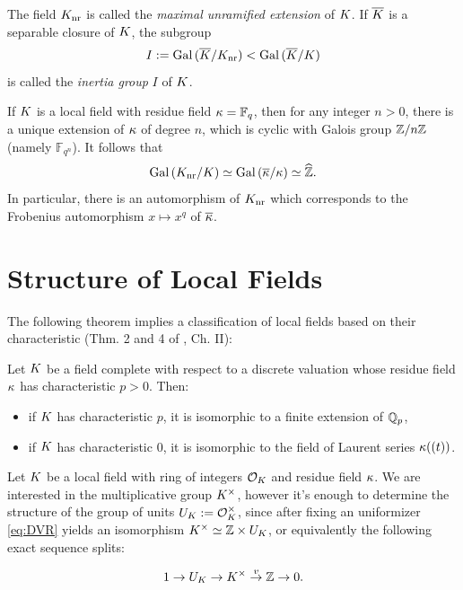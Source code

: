 \documentclass[a4paper, oneside]{memoir}
\begin{document}
The field $K_{\text{nr}}$ is called the \textit{maximal unramified extension} of $K$. If $\overline{K}$ is a separable closure of $K$, the subgroup
\[
	I:=\operatorname{Gal}{(\overline{K}/K_{\text{nr}})} < \operatorname{Gal}{(\overline{K}/K)}
\]
is called the \textit{inertia group} $I$ of $K$.

\begin{example}\label{ex:FinFields}
	If $K$ is a local field with residue field $\kappa=\mathbb{F}_q$, then for any integer $n>0$, there is a unique extension of $\kappa$ of degree $n$, which is cyclic with Galois group $\mathbb{Z}/n\mathbb{Z}$ (namely $\mathbb{F}_{q^n}$). It follows that
	\[
		\operatorname{Gal}{(K_{\text{nr}}/K)}\simeq \operatorname{Gal}{(\overline{\kappa} / \kappa)}\simeq \widehat{\mathbb{Z}}.
	\]
	In particular, there is an automorphism of $K_{\text{nr}}$ which corresponds to the Frobenius automorphism $x\mapsto x^q$ of $\overline{\kappa}$.
\end{example}

\section{Structure of Local Fields}

The following theorem implies a classification of local fields based on their characteristic (Thm. 2 and 4 of \cite{SerreCL}, Ch. II):

\begin{theorem}
	Let $K$ be a field complete with respect to a discrete valuation whose residue field $\kappa$ has characteristic $p>0$. Then:
	\begin{itemize}
		\item if $K$ has characteristic $p$, it is isomorphic to a finite extension of $\mathbb{Q}_p$,
		\item if $K$ has characteristic $0$, it is isomorphic to the field of Laurent series $\kappa((t))$.
	\end{itemize}
\end{theorem}

Let $K$ be a local field with ring of integers $\mathcal{O}_K$ and residue field $\kappa$. We are interested in the multiplicative group $K^\times$, however it's enough to determine the structure of the group of units $U_K:=\mathcal{O}_K^\times$, since after fixing an uniformizer \eqref{eq:DVR} yields an isomorphism $K^\times\simeq \mathbb{Z}\times U_K$, or equivalently the following exact sequence splits:

\begin{equation}\label{eq:SplitSeq}
	1\to U_K \to K^\times\overset{v}{\to}\mathbb{Z}\to 0.
\end{equation}
\end{document}
